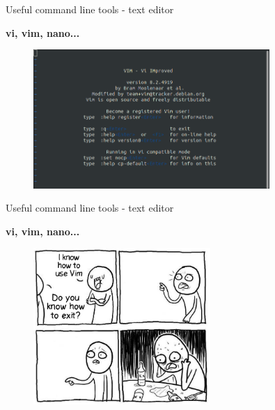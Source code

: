 \documentclass[10pt]{beamer}
\begin{document}
\begin{frame}[fragile]{Useful command line tools - text editor}

\textbf{vi, vim\footnotemark, nano\footnotemark... }

\begin{figure}[!ht]
\centering
\includegraphics[width = 0.8\textwidth]{images/vi.png}
\end{figure}


\end{frame}

\begin{frame}[fragile]{Useful command line tools - text editor}

\textbf{vi, vim, nano... }

\begin{figure}[!ht]
\centering
\includegraphics[width = 0.6\textwidth]{images/vim_meme.jpg}
\end{figure}

\end{frame}
\end{document}
